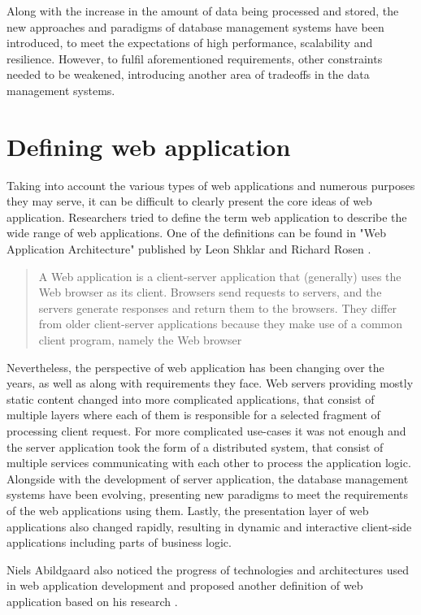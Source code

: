 Along with the increase in the amount of data being processed and stored, the new approaches and paradigms of database management systems have been introduced, to meet the expectations of high performance, scalability and resilience. However, to fulfil aforementioned requirements, other constraints needed to be weakened, introducing another area of tradeoffs in the data management systems.

\section{Defining web application}

Taking into account the various types of web applications and numerous purposes they may serve, it can be difficult to clearly present the core ideas of web application. Researchers tried to define the term web application to describe the wide range of web applications. One of the definitions can be found in "Web Application Architecture" published by Leon Shklar and Richard Rosen \cite{WebAppArchitecture}.

\begin{quotation}
A Web application is a client-server application that (generally) uses the Web browser as its client. Browsers send requests to servers, and the servers generate responses and return them to the browsers. They differ from older client-server applications because they make use of a common client program, namely the Web browser
\end{quotation}

Nevertheless, the perspective of web application has been changing over the years, as well as along with requirements they face. Web servers providing mostly static content changed into more complicated applications, that consist of multiple layers where each of them is responsible for a selected fragment of processing client request. For more complicated use-cases it was not enough and the server application took the form of a distributed system, that consist of multiple services communicating with each other to process the application logic. Alongside with the development of server application, the database management systems have been evolving, presenting new paradigms to meet the requirements of the web applications using them. Lastly, the presentation layer of web applications also changed rapidly, resulting in dynamic and interactive client-side applications including parts of business logic.

Niels Abildgaard also noticed the progress of technologies and architectures used in web application development and proposed another definition of web application based on his research \cite{PerspectivesOnArchitectureEvolution}.


